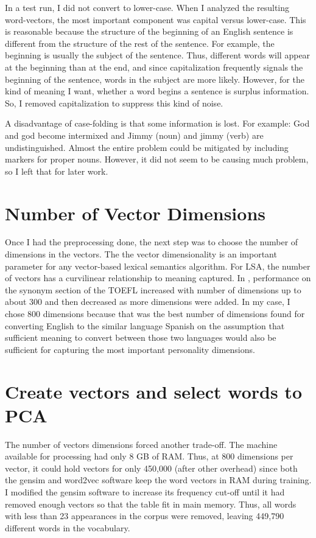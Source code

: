 In a test run, I did not convert to lower-case. When I analyzed the resulting 
word-vectors, the most important component was capital versus lower-case. This 
is reasonable because the structure of the beginning of an English sentence is 
different from the structure of the rest of the sentence. For example, the 
beginning is usually the subject of the sentence. Thus, different words will 
appear at the beginning than at the end, and since capitalization frequently 
signals the beginning of the sentence, words in the subject are more likely. 
However, for the kind of meaning I want, whether a word begins a sentence is 
surplus information. So, I removed capitalization to suppress this kind of 
noise.

A disadvantage of case-folding is that some information is lost. For example: 
God and god become intermixed and Jimmy (noun) and jimmy (verb) are 
undistinguished. Almost the entire problem could be mitigated by including 
markers for proper nouns. However, it did not seem to be causing much problem, 
so I left that for later work.

\section{Number of Vector Dimensions}

Once I had the preprocessing done, the next step was to choose the number of 
dimensions in the vectors. The the vector dimensionality is an important 
parameter for any vector-based lexical semantics algorithm. For LSA, the number 
of vectors has a curvilinear relationship to meaning captured. In , performance on the 
synonym section of the TOEFL  increased with number of 
dimensions up to about 300 and then decreased as more dimensions were added. In 
my case, I chose 800 dimensions because that was the best number of dimensions 
found for converting English to the similar language Spanish  on the assumption that sufficient meaning to convert between 
those two languages would also be sufficient for capturing the most important 
personality dimensions.

\section{Create vectors and select words to PCA}

The number of vectors dimensions forced another trade-off. The machine available
for processing had only 8 GB of RAM. Thus, at 800 dimensions per vector, it 
could hold vectors for only 450,000 (after other overhead) since both the 
gensim and word2vec software keep the word vectors in RAM during training. 
I modified the gensim software to increase its frequency cut-off until it had removed enough
vectors so that the table fit in main memory. Thus, all words with less than 
23 appearances in the corpus were removed, leaving 449,790 different words in
the vocabulary.

